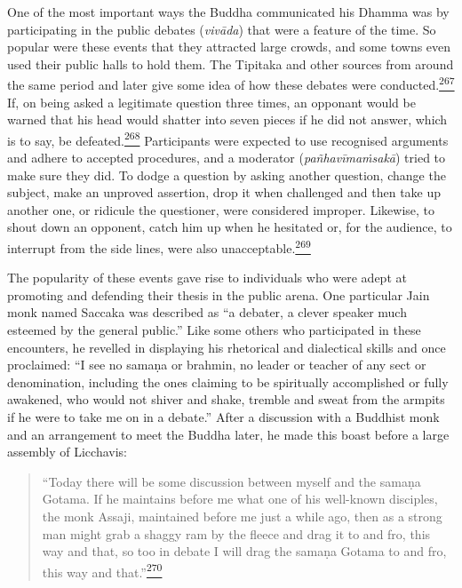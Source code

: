 One of the most important ways the Buddha communicated his Dhamma was by
participating in the public debates (\emph{vivāda}) that were a feature
of the time. So popular were these events that they attracted large
crowds, and some towns even used their public halls to hold them. The
Tipitaka and other sources from around the same period and later give
some idea of how these debates were
conducted.\label{footprints_split_010.html_fnref267}\hyperref[footprints_split_024.htmlux5cux23fn267]{\textsuperscript{267}}
If, on being asked a legitimate question three times, an opponant would
be warned that his head would shatter into seven pieces if he did not
answer, which is to say, be
defeated.\label{footprints_split_010.html_fnref268}\hyperref[footprints_split_024.htmlux5cux23fn268]{\textsuperscript{268}}
Participants were expected to use recognised arguments and adhere to
accepted procedures, and a moderator (\emph{pañhavīmaṁsakā}) tried to
make sure they did. To dodge a question by asking another question,
change the subject, make an unproved assertion, drop it when challenged
and then take up another one, or ridicule the questioner, were
considered improper. Likewise, to shout down an opponent, catch him up
when he hesitated or, for the audience, to interrupt from the side
lines, were also
unacceptable.\label{footprints_split_010.html_fnref269}\hyperref[footprints_split_024.htmlux5cux23fn269]{\textsuperscript{269}}

The popularity of these events gave rise to individuals who were adept
at promoting and defending their thesis in the public arena. One
particular Jain monk named Saccaka was described as ``a debater, a
clever speaker much esteemed by the general public.'' Like some others
who participated in these encounters, he revelled in displaying his
rhetorical and dialectical skills and once proclaimed: ``I see no samaṇa
or brahmin, no leader or teacher of any sect or denomination, including
the ones claiming to be spiritually accomplished or fully awakened, who
would not shiver and shake, tremble and sweat from the armpits if he
were to take me on in a debate.'' After a discussion with a Buddhist
monk and an arrangement to meet the Buddha later, he made this boast
before a large assembly of Licchavis:

\begin{quote}
``Today there will be some discussion between myself and the samaṇa
Gotama. If he maintains before me what one of his well-known disciples,
the monk Assaji, maintained before me just a while ago, then as a strong
man might grab a shaggy ram by the fleece and drag it to and fro, this
way and that, so too in debate I will drag the samaṇa Gotama to and fro,
this way and
that.''\label{footprints_split_010.html_fnref270}\hyperref[footprints_split_024.htmlux5cux23fn270]{\textsuperscript{270}}
\end{quote}

